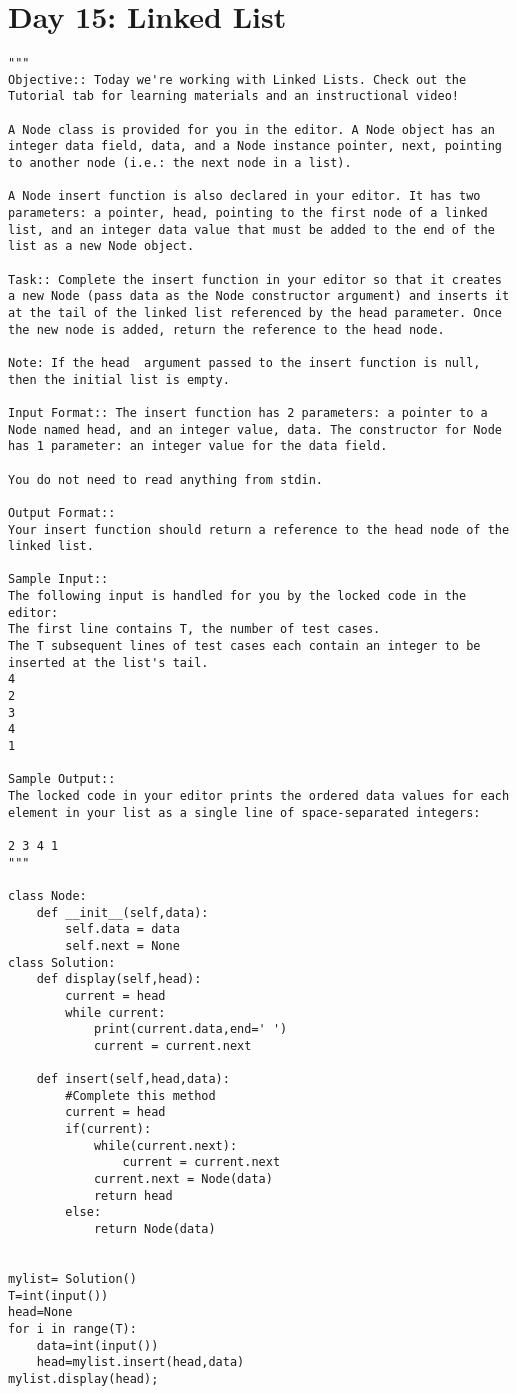 \documentclass[11pt,a4paper]{article}
\begin{document}
\newpage
\section{Day 15: Linked List}
\begin{lstlisting}
"""
Objective:: Today we're working with Linked Lists. Check out the Tutorial tab for learning materials and an instructional video!

A Node class is provided for you in the editor. A Node object has an integer data field, data, and a Node instance pointer, next, pointing to another node (i.e.: the next node in a list).

A Node insert function is also declared in your editor. It has two parameters: a pointer, head, pointing to the first node of a linked list, and an integer data value that must be added to the end of the list as a new Node object.

Task:: Complete the insert function in your editor so that it creates a new Node (pass data as the Node constructor argument) and inserts it at the tail of the linked list referenced by the head parameter. Once the new node is added, return the reference to the head node.

Note: If the head  argument passed to the insert function is null, then the initial list is empty.

Input Format:: The insert function has 2 parameters: a pointer to a Node named head, and an integer value, data. The constructor for Node has 1 parameter: an integer value for the data field.

You do not need to read anything from stdin.

Output Format:: 
Your insert function should return a reference to the head node of the linked list.

Sample Input:: 
The following input is handled for you by the locked code in the editor: 
The first line contains T, the number of test cases. 
The T subsequent lines of test cases each contain an integer to be inserted at the list's tail.
4
2
3
4
1

Sample Output::
The locked code in your editor prints the ordered data values for each element in your list as a single line of space-separated integers:

2 3 4 1
"""

class Node:
    def __init__(self,data):
        self.data = data
        self.next = None 
class Solution: 
    def display(self,head):
        current = head
        while current:
            print(current.data,end=' ')
            current = current.next
            
    def insert(self,head,data):
        #Complete this method
        current = head
        if(current):
            while(current.next):
                current = current.next
            current.next = Node(data)
            return head
        else:
            return Node(data)
            
            
mylist= Solution()
T=int(input())
head=None
for i in range(T):
    data=int(input())
    head=mylist.insert(head,data)    
mylist.display(head); 	  
\end{lstlisting}
\end{document}
